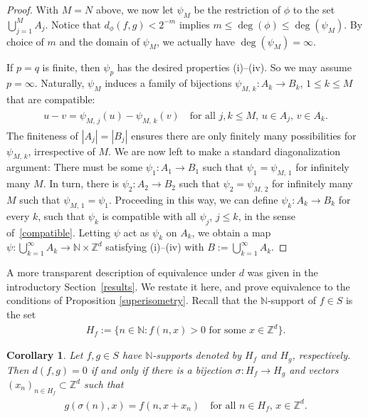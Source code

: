 \documentclass[11pt,reqno]{amsart}
\numberwithin{equation}{section}
\newtheorem{cor}[thm]{Corollary}
\theoremstyle{definition}
\begin{document}
\begin{proof}
With $M = N$ above, we now let $\psi_M$ be the restriction of $\phi$ to the set $\bigcup_{j = 1}^M A_j$.
Notice that $d_\phi(f,g) < 2^{-m}$ implies $m \leq \deg(\phi) \leq \deg(\psi_M)$.
By choice of $m$ and the domain of $\psi_M$, we actually have $\deg(\psi_M) = \infty$.

If $p = q$ is finite, then $\psi_{p}$ has the desired properties (i)--(iv).
So we may assume $p = \infty$.
Naturally, $\psi_M$ induces a family of bijections $\psi_{M,\, k} : A_k \to B_k$, $1 \leq k \leq M$ that are compatible:
{\begin{align} \begin{split} {
u - v = \psi_{M,\, j}(u) - \psi_{M,\, k}(v) \quad \text{for all $j,k \leq M$, $u \in A_j$, $v \in A_k$}. \label{compatible}
} \end{split} \end{align}}
The finiteness of $|A_j| = |B_j|$ ensures there are only finitely many possibilities for $\psi_{M,\, k}$, irrespective of $M$.
We are now left to make a standard diagonalization argument:
There must be some $\psi_1 : A_1 \to B_1$ such that $\psi_1 = \psi_{M,\, 1}$ for infinitely many $M$.
In turn, there is $\psi_2 : A_2 \to B_2$ such that $\psi_2 = \psi_{M,\, 2}$ for infinitely many $M$ such that $\psi_{M,\, 1} = \psi_1$.
Proceeding in this way, we can define $\psi_k : A_k \to B_k$ for every $k$, such that $\psi_k$ is compatible with all $\psi_j$, $j \leq k$, in the sense of~\eqref{compatible}.
Letting $\psi$ act as $\psi_k$ on $A_k$, we obtain a map $\psi : \bigcup_{k = 1}^\infty A_k \to {\mathbb{N}} \times {\mathbb{Z}}^d$ satisfying (i)--(iv) with $B :=  \bigcup_{k = 1}^\infty A_k$.
\end{proof}

A more transparent description of equivalence under $d$ was given in the introductory Section~\ref{results}.
We restate it here, and prove equivalence to the conditions of Proposition \ref{superisometry}.
Recall that the ${\mathbb{N}}$-support of $f \in S$ is the set
{\begin{align*} {
H_f := \{n \in {\mathbb{N}} : f(n,x) > 0 \text{ for some $x \in {\mathbb{Z}}^d$}\}.
} \end{align*}}

\begin{cor} \label{better_def_cor}
Let $f,g \in S$ have ${\mathbb{N}}$-supports denoted by $H_f$ and $H_g$, respectively.
Then $d(f,g) = 0$ if and only if there is a bijection $\sigma : H_f \to H_g$ and vectors $(x_n)_{n \in H_f} \subset {\mathbb{Z}}^d$ such that 
{\begin{align} \begin{split} {
g(\sigma(n),x) = f(n,x+x_n) \quad \text{for all $n \in H_f$, $x \in {\mathbb{Z}}^d$.} \label{better_def}
} \end{split} \end{align}}
\end{cor}
\end{document}
